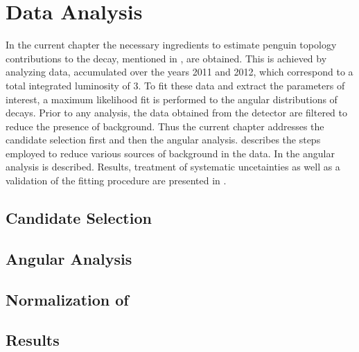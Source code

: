 \chapter{Data Analysis}
\label{Data_Analysis}

In the current chapter the necessary ingredients to estimate penguin topology contributions to the \BsJpsiPhi decay,
mentioned in , are obtained. This is achieved by analyzing \runone \lhcb data,
accumulated over the years 2011 and 2012, which correspond to a total integrated luminosity of 3\invfb.
To fit these data and extract the parameters of interest, a maximum likelihood fit is performed to the angular
distributions of \BsJpsiKst decays. Prior to any analysis, the data obtained from the detector are filtered
to reduce the presence of background. Thus the current chapter addresses the \Bs candidate selection first and
then the angular analysis.  describes the steps employed to reduce various sources of
background in the data. In  the angular analysis is described. Results, treatment of
systematic uncetainties as well as a validation of the fitting procedure are presented in .

\section{Candidate Selection}
\label{Event_Selection}


\section{Angular Analysis}
\label{Angular_Analysis}


\section{Normalization of \BsJpsiKpi}
\label{Normalization}


\section{Results}
\label{Results}

